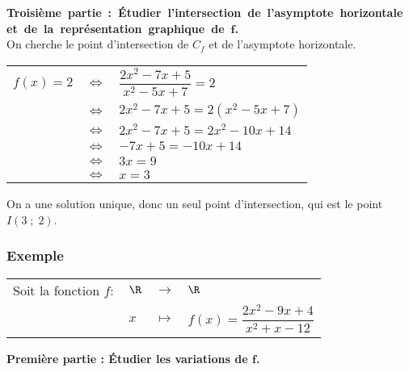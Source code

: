 \vspace*{.3cm}

\textbf{\hbox{Troisième partie : Étudier l'intersection de l'asymptote horizontale et de la représentation graphique de $\mathbf{f}$.}} \\

On cherche le point d'intersection de $C_f$ et de l'asymptote horizontale. \\

\begin{tabular}{lll}
$f(x) = 2$ & $\Longleftrightarrow$ & $\dfrac{2x^2 - 7x +5}{x^2 - 5x + 7} = 2$ \vspace*{.3cm} \\
& $\Longleftrightarrow$ & $2x^2 - 7x + 5 = 2\left(x^2 - 5x + 7\right)$ \vspace*{.3cm} \\
& $\Longleftrightarrow$ & $2x^2 - 7x +5 = 2x^2 - 10x + 14$ \vspace*{.3cm} \\
& $\Longleftrightarrow$ & $-7x + 5 = -10x + 14$ \vspace*{.3cm} \\
& $\Longleftrightarrow$ & $3x = 9$ \vspace*{.3cm} \\
& $\Longleftrightarrow$ & $x = 3$ \vspace*{.3cm} \\
\end{tabular}

On a une solution unique, donc un seul point d'intersection, qui est le point $I(3 \; ; \; 2)$.

\newpage

\vspace*{-2.8cm}

\subsubsection{Exemple }

\begin{tabular}{llll}
Soit la fonction $f :$ & $\R$ & $\longrightarrow$ & $\R$ \\
& $x$ & $\longmapsto$ & $f(x) = \dfrac{2x^2 - 9x +4}{x^2 + x - 12}$ \\
\end{tabular}

\vspace*{.3cm}

\textbf{Première partie : Étudier les variations de $\mathbf{f}$.} 

